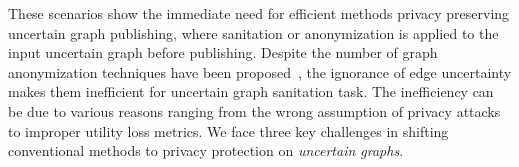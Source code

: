 \vspace{2mm}
These scenarios show the immediate need for efficient methods privacy preserving uncertain graph publishing, where sanitation or anonymization is applied to the input uncertain graph before publishing. Despite the number of graph anonymization techniques have been proposed~\cite{Liu_Towards_2008, Boldi_Injecting_2012,  Mittal_Preserving_2013, Bonchi_Identity_2014}, the ignorance of edge uncertainty makes them inefficient for uncertain graph sanitation task. The inefficiency can be due to various reasons ranging from the wrong assumption of privacy attacks to improper utility loss metrics. We face three key challenges in shifting conventional methods to privacy protection on \emph{uncertain graphs}. 


